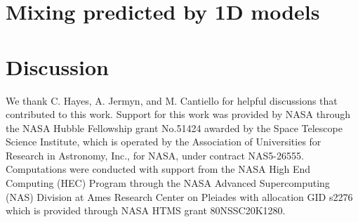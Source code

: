 \documentclass[linenumbers,twocolumn]{aastex62}
\begin{document}
\section{Mixing predicted by 1D models}
\label{sec:mesa_models}






\section{Discussion}
\label{sec:discussion}





\begin{comment}
\begin{figure}[!htb]
\begin{center}
\texttt{[image: ./Figs/protversusloggmodelpmmPYboth.eps]}%
\caption{The measured core rotation rates for the stars in our sample as a function of gravity compared to the predictions of our solid body model (blue) and our model with a moderately differentially convection zone (pink), showing that these models provide limits on the allowable amount of radial differential rotation in the surface convection zone.}
\label{Fig:bothmodels}
\end{center}
\end{figure}
\end{comment}

\begin{acknowledgements}

We thank C. Hayes, A. Jermyn, and M. Cantiello for helpful discussions that contributed to this work. 
 Support for this work was provided by NASA through the NASA Hubble Fellowship grant No.51424 awarded by the Space Telescope Science Institute, which is operated by the Association of Universities for Research in Astronomy, Inc., for NASA, under contract NAS5-26555.
 Computations were conducted with support from the NASA High End Computing (HEC) Program through the NASA Advanced Supercomputing (NAS) Division at Ames Research Center on Pleiades with allocation GID s2276 which is provided through NASA HTMS grant 80NSSC20K1280.



\end{acknowledgements}
\end{document}
